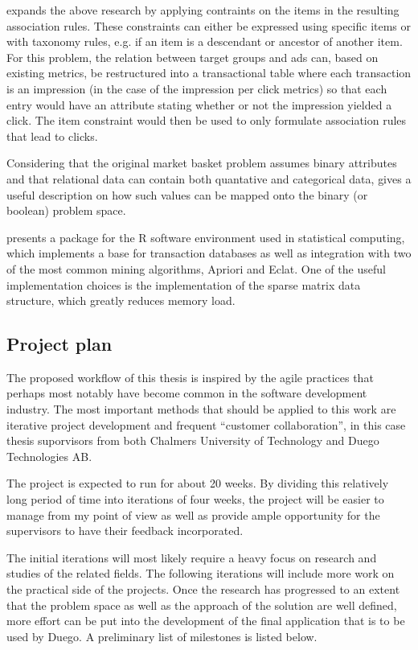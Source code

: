 \documentclass[a4paper]{article}
\begin{document}
\citet{Srikant1997} expands the above research by applying contraints on the items in the resulting association rules. These constraints can either be expressed using specific items or with taxonomy rules, e.g. if an item is a descendant or ancestor of another item. For this problem, the relation between target groups and ads can, based on existing metrics, be restructured into a transactional table where each transaction is an impression (in the case of the impression per click metrics) so that each entry would have an attribute stating whether or not the impression yielded a click. The item constraint would then be used to only formulate association rules that lead to clicks.

Considering that the original market basket problem assumes binary attributes and that relational data can contain both quantative and categorical data, \citep{Srikant1996} gives a useful description on how such values can be mapped onto the binary (or boolean) problem space.

\citet{Hahsler2007} presents a package for the R software environment used in statistical computing, which implements a base for transaction databases as well as integration with two of the most common mining algorithms, Apriori and Eclat. One of the useful implementation choices is the implementation of the sparse matrix data structure, which greatly reduces memory load.

\subsection{Project plan}
The proposed workflow of this thesis is inspired by the agile practices that perhaps most notably have become common in the software development industry. The most important methods that should be applied to this work are iterative project development and frequent ``customer collaboration'', in this case thesis suporvisors from both Chalmers University of Technology and Duego Technologies AB.

The project is expected to run for about 20 weeks. By dividing this relatively long period of time into iterations of four weeks, the project will be easier to manage from my point of view as well as provide ample opportunity for the supervisors to have their feedback incorporated.

The initial iterations will most likely require a heavy focus on research and studies of the related fields. The following iterations will include more work on the practical side of the projects. Once the research has progressed to an extent that the problem space as well as the approach of the solution are well defined, more effort can be put into the development of the final application that is to be used by Duego. A preliminary list of milestones is listed below.
\end{document}
